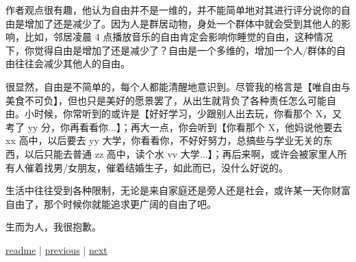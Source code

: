 作者观点很有趣，他认为自由并不是一维的，并不能简单地对其进行评分说你的自由是增加了还是减少了。因为人是群居动物，身处一个群体中就会受到其他人的影响，比如，邻居凌晨 4 点播放音乐的自由肯定会影响你睡觉的自由，这种情况下，你觉得自由是增加了还是减少了？自由是一个多维的，增加一个人/群体的自由往往会减少其他人的自由。

很显然，自由是不简单的，每个人都能清醒地意识到。尽管我的格言是【唯自由与美食不可负】，但也只是美好的愿景罢了，从出生就背负了各种责任怎么可能自由。小时候，你常听到的或许是【好好学习，少跟别人出去玩，你看那个 X，又考了 yy 分，你再看看你...】；再大一点，你会听到【你看那个 X，他妈说他要去 xx 高中，以后要去 yy 大学，你看看你，不好好努力，总搞些与学业无关的东西，以后只能去普通 zz 高中，读个水 vv 大学...】；再后来啊，或许会被家里人所有人催着找男/女朋友，催着结婚生子，如此而已，没什么好说的。

生活中往往受到各种限制，无论是来自家庭还是旁人还是社会，或许某一天你财富自由了，那个时候你就能追求更广阔的自由了吧。

生而为人，我很抱歉。

\noindent \href{https://github.com/taseikyo/arts}{readme} | \hyperref[chap:w2]{previous} | \hyperref[chap:w4]{next}
